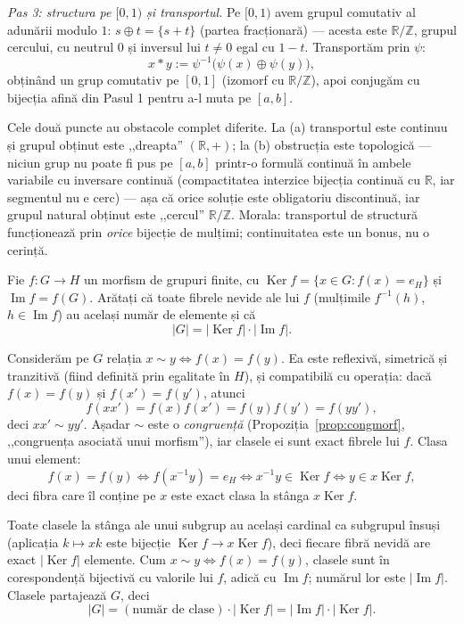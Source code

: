 \begin{solutie}
\textit{Pas 3: structura pe $[0,1)$ și transportul.} Pe $[0,1)$ avem
grupul comutativ al adunării modulo $1$: $s\oplus t=\{s+t\}$ (partea
fracționară) --- acesta este $\mathbb{R}/\mathbb{Z}$, grupul
cercului, cu neutrul $0$ și inversul lui $t\neq 0$ egal cu $1-t$.
Transportăm prin $\psi$:
\[
  x*y:=\psi^{-1}\bigl(\psi(x)\oplus\psi(y)\bigr),
\]
obținând un grup comutativ pe $[0,1]$ (izomorf cu
$\mathbb{R}/\mathbb{Z}$), apoi conjugăm cu bijecția afină din
Pasul 1 pentru a-l muta pe $[a,b]$.
\end{solutie}

\begin{obs}
Cele două puncte au obstacole complet diferite. La (a) transportul este
continuu și grupul obținut este ,,dreapta'' $(\mathbb{R},+)$; la (b)
obstrucția este topologică --- niciun grup nu poate fi pus pe
$[a,b]$ printr-o formulă continuă în ambele variabile cu inversare
continuă (compactitatea interzice bijecția continuă cu
$\mathbb{R}$, iar segmentul nu e cerc) --- așa că orice soluție
este obligatoriu discontinuă, iar grupul natural obținut este
,,cercul'' $\mathbb{R}/\mathbb{Z}$. Morala: transportul de structură
funcționează prin \emph{orice} bijecție de mulțimi;
continuitatea este un bonus, nu o cerință.
\end{obs}

\begin{problema}[Clasică]
Fie $f:G\to H$ un morfism de grupuri finite, cu
$\operatorname{Ker}f=\{x\in G:f(x)=e_{H}\}$ și $\operatorname{Im}f=f(G)$.
Arătați că toate fibrele nevide ale lui $f$ (mulțimile
$f^{-1}(h)$, $h\in\operatorname{Im}f$) au același număr de elemente
și că
\[
  |G|=|\operatorname{Ker}f|\cdot|\operatorname{Im}f| .
\]
\end{problema}

\begin{solutie}
Considerăm pe $G$ relația $x\sim y\iff f(x)=f(y)$. Ea este
reflexivă, simetrică și tranzitivă (fiind definită prin
egalitate în $H$), și compatibilă cu operația: dacă
$f(x)=f(y)$ și $f(x')=f(y')$, atunci
\[
  f(xx')=f(x)f(x')=f(y)f(y')=f(yy'),
\]
deci $xx'\sim yy'$. Așadar $\sim$ este o \emph{congruență}
(Propoziția~\ref{prop:congmorf}, ,,congruența asociată unui morfism''), iar
clasele ei sunt exact fibrele lui $f$. Clasa unui element:
\[
  f(x)=f(y)\iff f(x^{-1}y)=e_{H}\iff x^{-1}y\in\operatorname{Ker}f
  \iff y\in x\operatorname{Ker}f,
\]
deci fibra care îl conține pe $x$ este exact clasa la stânga
$x\operatorname{Ker}f$.

Toate clasele la stânga ale unui subgrup au același cardinal ca
subgrupul însuși (aplicația $k\mapsto xk$ este bijecție
$\operatorname{Ker}f\to x\operatorname{Ker}f$), deci fiecare fibră nevidă
are exact $|\operatorname{Ker}f|$ elemente. Cum $x\sim y\iff f(x)=f(y)$,
clasele sunt în corespondență bijectivă cu valorile lui $f$,
adică cu $\operatorname{Im}f$; numărul lor este $|\operatorname{Im}f|$.
Clasele partajează $G$, deci
\[
  |G|=(\text{număr de clase})\cdot|\operatorname{Ker}f|
     =|\operatorname{Im}f|\cdot|\operatorname{Ker}f| .
\]
\end{solutie}

